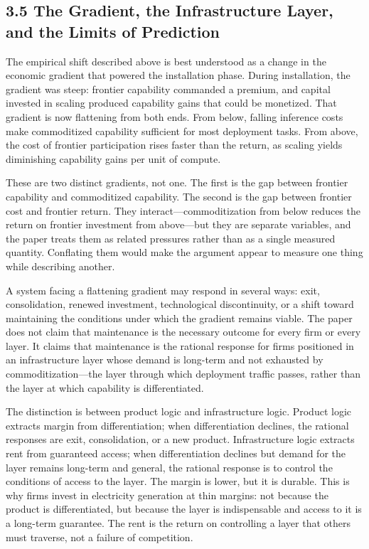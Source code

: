 \subsection*{3.5 The Gradient, the Infrastructure Layer, and the Limits of Prediction}

The empirical shift described above is best understood as a change in the economic gradient that powered the installation phase. During installation, the gradient was steep: frontier capability commanded a premium, and capital invested in scaling produced capability gains that could be monetized. That gradient is now flattening from both ends. From below, falling inference costs make commoditized capability sufficient for most deployment tasks. From above, the cost of frontier participation rises faster than the return, as scaling yields diminishing capability gains per unit of compute.

These are two distinct gradients, not one. The first is the gap between frontier capability and commoditized capability. The second is the gap between frontier cost and frontier return. They interact---commoditization from below reduces the return on frontier investment from above---but they are separate variables, and the paper treats them as related pressures rather than as a single measured quantity. Conflating them would make the argument appear to measure one thing while describing another.

A system facing a flattening gradient may respond in several ways: exit, consolidation, renewed investment, technological discontinuity, or a shift toward maintaining the conditions under which the gradient remains viable. The paper does not claim that maintenance is the necessary outcome for every firm or every layer. It claims that maintenance is the rational response for firms positioned in an infrastructure layer whose demand is long-term and not exhausted by commoditization---the layer through which deployment traffic passes, rather than the layer at which capability is differentiated.

The distinction is between product logic and infrastructure logic. Product logic extracts margin from differentiation; when differentiation declines, the rational responses are exit, consolidation, or a new product. Infrastructure logic extracts rent from guaranteed access; when differentiation declines but demand for the layer remains long-term and general, the rational response is to control the conditions of access to the layer. The margin is lower, but it is durable. This is why firms invest in electricity generation at thin margins: not because the product is differentiated, but because the layer is indispensable and access to it is a long-term guarantee. The rent is the return on controlling a layer that others must traverse, not a failure of competition.

